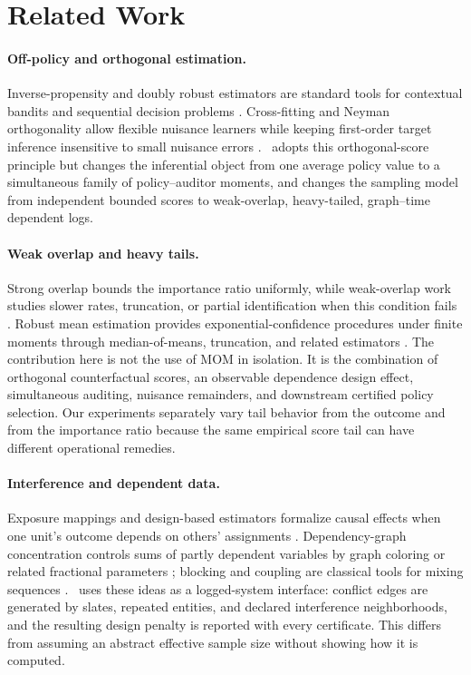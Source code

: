 \section{Related Work}
\label{sec:related}

\paragraph{Off-policy and orthogonal estimation.}
Inverse-propensity and doubly robust estimators are standard tools for contextual bandits and sequential decision problems \citep{dudik2011doubly,jiang2016doubly,wang2017optimal,farajtabar2018more}. Cross-fitting and Neyman orthogonality allow flexible nuisance learners while keeping first-order target inference insensitive to small nuisance errors \citep{chernozhukov2018double,foster2019orthogonal}. \COMET\ adopts this orthogonal-score principle but changes the inferential object from one average policy value to a simultaneous family of policy--auditor moments, and changes the sampling model from independent bounded scores to weak-overlap, heavy-tailed, graph--time dependent logs.

\paragraph{Weak overlap and heavy tails.}
Strong overlap bounds the importance ratio uniformly, while weak-overlap work studies slower rates, truncation, or partial identification when this condition fails \citep{mehrabi2024weak,khan2024beyond}. Robust mean estimation provides exponential-confidence procedures under finite moments through median-of-means, truncation, and related estimators \citep{lugosi2019mean}. The contribution here is not the use of MOM in isolation. It is the combination of orthogonal counterfactual scores, an observable dependence design effect, simultaneous auditing, nuisance remainders, and downstream certified policy selection. Our experiments separately vary tail behavior from the outcome and from the importance ratio because the same empirical score tail can have different operational remedies.

\paragraph{Interference and dependent data.}
Exposure mappings and design-based estimators formalize causal effects when one unit's outcome depends on others' assignments \citep{aronow2017estimating,savje2021average}. Dependency-graph concentration controls sums of partly dependent variables by graph coloring or related fractional parameters \citep{janson2004large}; blocking and coupling are classical tools for mixing sequences \citep{merlevede2009bernstein}. \COMET\ uses these ideas as a logged-system interface: conflict edges are generated by slates, repeated entities, and declared interference neighborhoods, and the resulting design penalty is reported with every certificate. This differs from assuming an abstract effective sample size without showing how it is computed.


